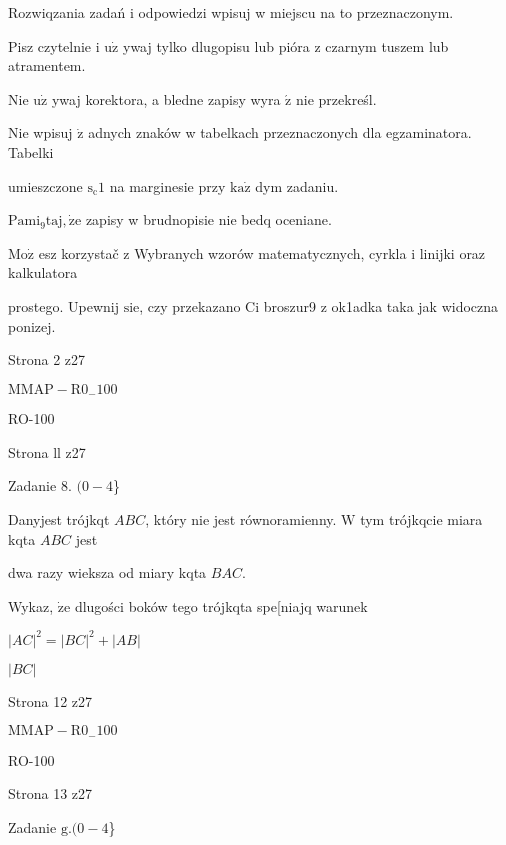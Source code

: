 \documentclass[a4paper,12pt]{article}
\begin{document}
Rozwiqzania zadań i odpowiedzi wpisuj w miejscu na to przeznaczonym.

Pisz czytelnie i $\mathrm{u}\dot{\mathrm{z}}$ ywaj tylko dlugopisu lub pióra z czarnym tuszem lub atramentem.

Nie $\mathrm{u}\dot{\mathrm{z}}$ ywaj korektora, a bledne zapisy wyra $\acute{\mathrm{z}}$ nie przekreśl.

Nie wpisuj $\dot{\mathrm{z}}$ adnych znaków w tabelkach przeznaczonych dla egzaminatora. Tabelki

umieszczone $\mathrm{s}_{\mathrm{c}}1$ na marginesie przy $\mathrm{k}\mathrm{a}\dot{\mathrm{z}}$ dym zadaniu.

$\mathrm{P}\mathrm{a}\mathrm{m}\mathrm{i}_{9}\mathrm{t}\mathrm{a}\mathrm{j}, \dot{\mathrm{z}}\mathrm{e}$ zapisy w brudnopisie nie bedq oceniane.

$\mathrm{M}\mathrm{o}\dot{\mathrm{z}}$ esz korzystač z Wybranych wzorów matematycznych, cyrkla i linijki oraz kalkulatora

prostego. Upewnij $\mathrm{s}\mathrm{i}\mathrm{e}$, czy przekazano Ci broszur9 z ok1adka taka jak widoczna ponizej.

Strona 2 z27

$\mathrm{M}\mathrm{M}\mathrm{A}\mathrm{P}-\mathrm{R}0_{-}100$





RO-100

Strona ll z27





Zadanie 8. $(0-4$\}

Danyjest trójkqt $ABC$, który nie jest równoramienny. $\mathrm{W}$ tym trójkqcie miara kqta $ABC$ jest

dwa razy wieksza od miary kqta $BAC.$

Wykaz, $\dot{\mathrm{z}}\mathrm{e}$ dlugości boków tego trójkqta spe[niajq warunek

$|AC|^{2}=|BC|^{2}+|AB|$

$|BC|$

Strona 12 z27

$\mathrm{M}\mathrm{M}\mathrm{A}\mathrm{P}-\mathrm{R}0_{-}100$





RO-100

Strona 13 z27





Zadanie $\mathrm{g}. (0-4$\}
\end{document}
